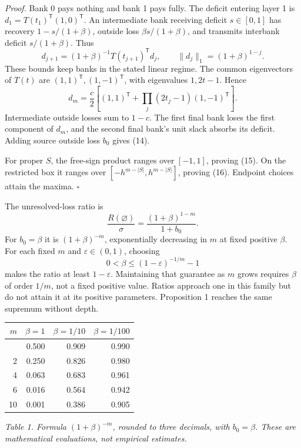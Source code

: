 \documentclass[
  british,
  11pt,
  a4paper,
]{article}
\newcounter{none} %
\begin{document}
\emph{Proof.} Bank 0 pays nothing and bank 1 pays fully. The deficit
entering layer 1 is \(d_1=T(t_1)^\mathsf T(1,0)^\mathsf T\). An
intermediate bank receiving deficit \(s\in[0,1]\) has recovery
\(1-s/(1+\beta)\), outside loss \(\beta s/(1+\beta)\), and transmits
interbank deficit \(s/(1+\beta)\). Thus \[
d_{j+1}=(1+\beta)^{-1}T(t_{j+1})^\mathsf T d_j,\qquad
\|d_j\|_1=(1+\beta)^{1-j}.
\] These bounds keep banks in the stated linear regime. The common
eigenvectors of \(T(t)\) are \((1,1)^\mathsf T,(1,-1)^\mathsf T\), with
eigenvalues \(1,2t-1\). Hence \[
d_m=\frac c2\left[(1,1)^\mathsf T+
\prod_j(2t_j-1)(1,-1)^\mathsf T\right].
\] Intermediate outside losses sum to \(1-c\). The first final bank
loses the first component of \(d_m\), and the second final bank's unit
slack absorbs its deficit. Adding source outside loss \(b_0\) gives
(14).

For proper \(S\), the free-sign product ranges over \([-1,1]\), proving
(15). On the restricted box it ranges over \([-h^{m-|S|},h^{m-|S|}]\),
proving (16). Endpoint choices attain the maxima. \(\square\)

The unresolved-loss ratio is \[
\frac{R(\varnothing)}{\sigma}
=\frac{(1+\beta)^{1-m}}{1+b_0}.
\tag{17}
\] For \(b_0=\beta\) it is \((1+\beta)^{-m}\), exponentially decreasing
in \(m\) at fixed positive \(\beta\). For each fixed \(m\) and
\(\varepsilon\in(0,1)\), choosing \[
0<\beta\le(1-\varepsilon)^{-1/m}-1
\] makes the ratio at least \(1-\varepsilon\). Maintaining that
guarantee as \(m\) grows requires \(\beta\) of order \(1/m\), not a
fixed positive value. Ratios approach one in this family but do not
attain it at its positive parameters. Proposition 1 reaches the same
supremum without depth.

{\def\LTcaptype{none} %
\begin{longtable}[]{@{}rrrr@{}}
\toprule\noalign{}
\(m\) & \(\beta=1\) & \(\beta=1/10\) & \(\beta=1/100\) \\
\midrule\noalign{}
\endhead
\bottomrule\noalign{}
\endlastfoot
1 & 0.500 & 0.909 & 0.990 \\
2 & 0.250 & 0.826 & 0.980 \\
4 & 0.063 & 0.683 & 0.961 \\
6 & 0.016 & 0.564 & 0.942 \\
10 & 0.001 & 0.386 & 0.905 \\
\end{longtable}
}

\emph{Table 1. Formula \((1+\beta)^{-m}\), rounded to three decimals,
with \(b_0=\beta\). These are mathematical evaluations, not empirical
estimates.}
\end{document}
